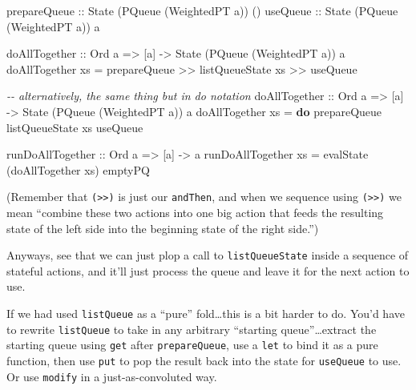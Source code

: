 \documentclass[]{article}
\newenvironment{Shaded}{}{}
\newcommand{\CommentTok}[1]{\textcolor[rgb]{0.38,0.63,0.69}{\textit{#1}}}
\newcommand{\DataTypeTok}[1]{\textcolor[rgb]{0.56,0.13,0.00}{#1}}
\newcommand{\KeywordTok}[1]{\textcolor[rgb]{0.00,0.44,0.13}{\textbf{#1}}}
\newcommand{\NormalTok}[1]{#1}
\newcommand{\OperatorTok}[1]{\textcolor[rgb]{0.40,0.40,0.40}{#1}}
\newcommand{\OtherTok}[1]{\textcolor[rgb]{0.00,0.44,0.13}{#1}}
\begin{document}
\begin{Shaded}
\begin{Highlighting}[]
\OtherTok{prepareQueue ::} \DataTypeTok{State}\NormalTok{ (}\DataTypeTok{PQueue}\NormalTok{ (}\DataTypeTok{WeightedPT}\NormalTok{ a)) ()}
\OtherTok{useQueue     ::} \DataTypeTok{State}\NormalTok{ (}\DataTypeTok{PQueue}\NormalTok{ (}\DataTypeTok{WeightedPT}\NormalTok{ a)) a}

\OtherTok{doAllTogether ::} \DataTypeTok{Ord}\NormalTok{ a }\OtherTok{=>}\NormalTok{ [a] }\OtherTok{{-}>} \DataTypeTok{State}\NormalTok{ (}\DataTypeTok{PQueue}\NormalTok{ (}\DataTypeTok{WeightedPT}\NormalTok{ a)) a}
\NormalTok{doAllTogether xs }\OtherTok{=}\NormalTok{ prepareQueue }\OperatorTok{>>}\NormalTok{ listQueueState xs }\OperatorTok{>>}\NormalTok{ useQueue}

\CommentTok{{-}{-} alternatively, the same thing but in do notation}
\OtherTok{doAllTogether\textquotesingle{} ::} \DataTypeTok{Ord}\NormalTok{ a }\OtherTok{=>}\NormalTok{ [a] }\OtherTok{{-}>} \DataTypeTok{State}\NormalTok{ (}\DataTypeTok{PQueue}\NormalTok{ (}\DataTypeTok{WeightedPT}\NormalTok{ a)) a}
\NormalTok{doAllTogether\textquotesingle{} xs }\OtherTok{=} \KeywordTok{do}
\NormalTok{    prepareQueue}
\NormalTok{    listQueueState xs}
\NormalTok{    useQueue}

\OtherTok{runDoAllTogether ::} \DataTypeTok{Ord}\NormalTok{ a }\OtherTok{=>}\NormalTok{ [a] }\OtherTok{{-}>}\NormalTok{ a}
\NormalTok{runDoAllTogether xs }\OtherTok{=}\NormalTok{ evalState (doAllTogether xs) emptyPQ}
\end{Highlighting}
\end{Shaded}

(Remember that \texttt{(\textgreater{}\textgreater{})} is just our
\texttt{andThen}, and when we sequence using
\texttt{(\textgreater{}\textgreater{})} we mean ``combine these two actions into
one big action that feeds the resulting state of the left side into the
beginning state of the right side.'')

Anyways, see that we can just plop a call to \texttt{listQueueState} inside a
sequence of stateful actions, and it'll just process the queue and leave it for
the next action to use.

If we had used \texttt{listQueue} as a ``pure'' fold\ldots this is a bit harder
to do. You'd have to rewrite \texttt{listQueue} to take in any arbitrary
``starting queue''\ldots extract the starting queue using \texttt{get} after
\texttt{prepareQueue}, use a \texttt{let} to bind it as a pure function, then
use \texttt{put} to pop the result back into the state for \texttt{useQueue} to
use. Or use \texttt{modify} in a just-as-convoluted way.
\end{document}

